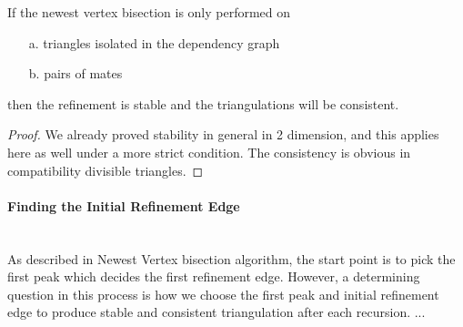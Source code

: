     \begin{lemma*}
    If the newest vertex bisection is only performed on 
    \begin{itemize}
        \item[a. ] triangles isolated in the dependency graph
        \item[b. ] pairs of mates
      \end{itemize}
    then the refinement is stable and the triangulations will be consistent.
    \end{lemma*}
    \begin{proof}
    We already proved stability in general in 2 dimension, and this applies here as well under a more strict condition. The consistency is obvious in compatibility divisible triangles.
    \end{proof}

    \paragraph{Finding the Initial Refinement Edge}\mbox{}\\
    As described in Newest Vertex bisection algorithm, the start point is to pick the first peak which decides the first refinement edge. However, a determining question in this process is how we choose the first peak and initial refinement edge to produce stable and consistent triangulation after each recursion. ...


